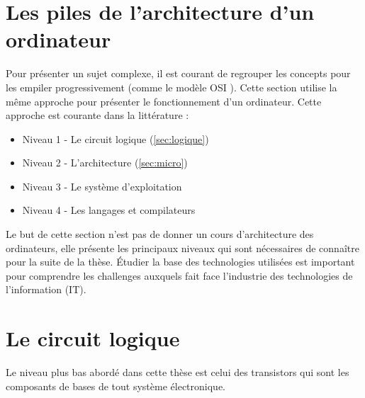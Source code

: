 \section{Les piles de l'architecture d'un ordinateur}


Pour présenter un sujet complexe, il est courant de regrouper les concepts pour les empiler progressivement (comme le modèle OSI \cite{day1983osi}). Cette section utilise la même approche pour présenter le fonctionnement d'un ordinateur. Cette approche est courante dans la littérature \cite{tanenbaum2016structured, Jalby2013}:

\begin{itemize}
    \item Niveau 1 - Le circuit logique (\autoref{sec:logique})
    \item Niveau 2 - L'architecture (\autoref{sec:micro})
    \item Niveau 3 - Le système d'exploitation
    \item Niveau 4 - Les langages et compilateurs
\end{itemize}

Le but de cette section n'est pas de donner un cours d'architecture des ordinateurs, elle présente les principaux niveaux qui sont nécessaires de connaître pour la suite de la thèse. Étudier la base des technologies utilisées est important pour comprendre les challenges auxquels fait face l'industrie des technologies de l'information (IT).


\section{Le circuit logique} \label{sec:logique}
Le niveau plus bas abordé dans cette thèse est celui des transistors qui sont les composants de bases de tout système électronique. 

